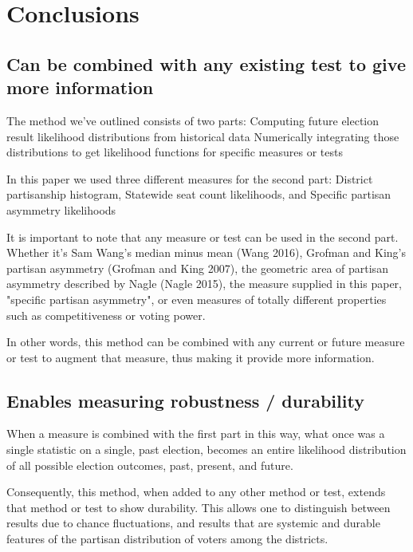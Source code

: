 \documentclass[preprint,12pt]{article}
\begin{document}
\section{Conclusions}

\subsection{Can be combined with any existing test to give more information}
 
The method we've outlined consists of two parts: 
Computing future election result likelihood distributions from historical data
Numerically integrating those distributions to get likelihood functions for specific measures or tests
 
In this paper we used three different measures for the second part:
District partisanship histogram,
Statewide seat count likelihoods, and 
Specific partisan asymmetry likelihoods
 
It is important to note that any measure or test can be used in the second part.  Whether it's Sam Wang's median minus mean (Wang 2016), Grofman and King's partisan asymmetry  (Grofman and King 2007), the geometric area of partisan asymmetry described by Nagle (Nagle 2015), the measure supplied in this paper, "specific partisan asymmetry", or even measures of totally different properties such as competitiveness or voting power.
 
In other words, this method can be combined with any current or future measure or test to augment that measure, thus making it provide more information.
 
\subsection{Enables measuring robustness / durability}
 
When a measure is combined with the first part in this way, what once was a single statistic on a single, past election, becomes an entire likelihood distribution of all possible election outcomes, past, present, and future.
 
Consequently, this method, when added to any other method or test, extends that method or test to show durability.  This allows one to distinguish between results due to chance fluctuations, and results that are systemic and durable features of the partisan distribution of voters among the districts.


\clearpage
\section*{}
%
%
\clearpage
\end{document}
